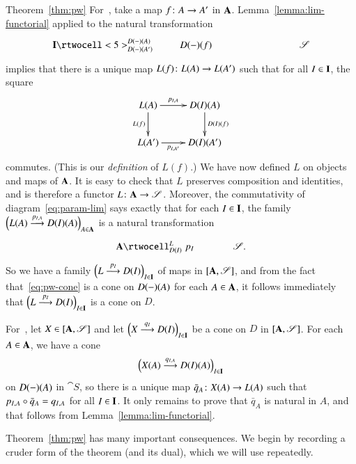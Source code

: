 \begin{pfof}{Theorem~\ref{thm:pw}}
For~, take a map $f\from A \to A'$ in $\mathbf{A}$.
Lemma~\ref{lemma:lim-functorial} applied
to the natural transformation
\[
\xymatrix@C+6em{
\scat{I} \rtwocell<5>^{D(\dashbk)(A)}_{D(\dashbk)(A')}%
{\hspace{2.5em}D(\dashbk)(f)}      &
\cat{S}
}
\]
implies that there is a unique map $L(f)\from L(A) \to L(A')$ such that for
all $I \in \mathbf{I}$, the square
%
\begin{equation}
\label{eq:param-lim}
\begin{array}{c}
\xymatrix{
L(A) \ar[r]^-{p_{I, A}} \ar[d]_{L(f)}   &
D(I)(A) \ar[d]^{D(I)(f)}        \\
L(A') \ar[r]_-{p_{I, A'}}       &
D(I)(A')
}
\end{array}
\end{equation}
%
commutes.  (This is our \emph{definition} of $L(f)$.)  We have now defined $L$
on objects and maps of $\mathbf{A}$.  It is easy to check that $L$ preserves
composition and identities, and is therefore a functor $L\from \scat{A}
\to \cat{S}$.  Moreover, the commutativity of diagram~\eqref{eq:param-lim}
says exactly that for each $I \in \mathbf{I}$, the family $\Bigl(L(A)
\stackrel{p_{I, A}}{\longrightarrow} D(I)(A)\Bigr)_{A \in \mathbf{A}}$ is a natural
transformation
\[
\xymatrix@C+1em{
\scat{A} \rtwocell^{L}_{D(I)}{\hspace{.3em}p_I} &\cat{S}.
}
\]
So we have a family $\Bigl(L \stackrel{p_I}{\longrightarrow} D(I)\Bigr)_{I \in \mathbf{I}}$ of
maps in $[\mathbf{A},\mathscr{S}]$, and from the fact
that~\eqref{eq:pw-cone} is a cone on $D(-)(A)$ for each $A \in
\mathbf{A}$, it follows immediately that $\Bigl(L \stackrel{p_I}{\longrightarrow} D(I)\Bigr)_{I
  \in \mathbf{I}}$ is a cone on $D$.

For~, let $X \in [\mathbf{A},\mathscr{S}]$ and let
$\Bigl(X \stackrel{q_I}{\longrightarrow} D(I)\Bigr)_{I \in \mathbf{I}}$ be a cone on $D$ in
$[\mathbf{A},\mathscr{S}]$.  For each $A \in \mathbf{A}$, we have a cone
\[
\Bigl(X(A) \stackrel{q_{I, A}}{\longrightarrow} D(I)(A)\Bigr)_{I \in \mathbf{I}}
\]
on
$D(-)(A)$ in $\cat{S}$, so there is a unique map $\bar{q}_A\from X(A)
\to L(A)$ such that $p_{I, A} \mathbin{\circ} \bar{q}_A = q_{I, A}$ for all $I \in
\mathbf{I}$.  It only remains to prove that $\bar{q}_A$ is natural in $A$, and
that follows from
Lemma~\ref{lemma:lim-functorial}.
\end{pfof}

Theorem~\ref{thm:pw} has many important consequences.  We begin by recording
a cruder form of the theorem (and its dual), which we will use repeatedly.

